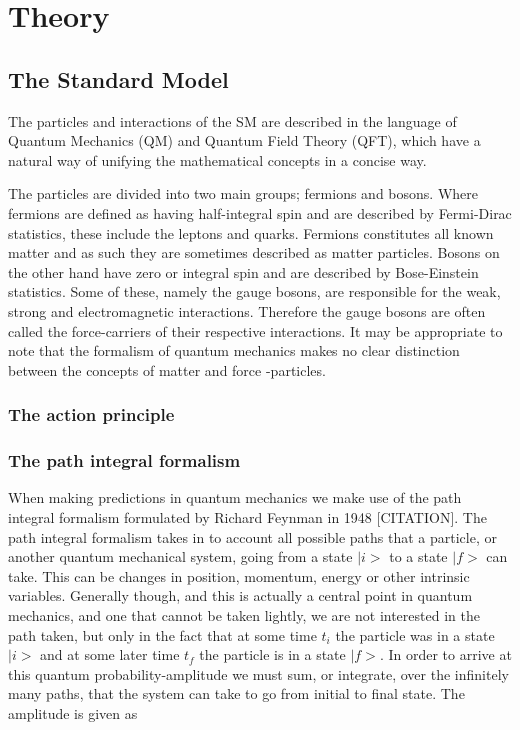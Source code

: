 \section{Theory}
\subsection{The Standard Model}
The particles and interactions of the SM are described in the language of Quantum Mechanics (QM) and Quantum Field Theory (QFT), which have a natural way of unifying the mathematical concepts in a concise way.

The particles are divided into two main groups; fermions and bosons. Where fermions are defined as having half-integral spin and are described by Fermi-Dirac statistics, these include the leptons and quarks. Fermions constitutes all known matter and as such they are sometimes described as matter particles. Bosons on the other hand have zero or integral spin and are described by Bose-Einstein statistics. Some of these, namely the gauge bosons, are responsible for the weak, strong and electromagnetic interactions. Therefore the gauge bosons are often called the force-carriers of their respective interactions. It may be appropriate to note that the formalism of quantum mechanics makes no clear distinction between the concepts of matter and force -particles.


\subsubsection{The action principle}

\subsubsection{The path integral formalism}
When making predictions in quantum mechanics we make use of the path integral formalism formulated by Richard Feynman in 1948 [CITATION]. The path integral formalism takes in to account all possible paths that a particle, or another quantum mechanical system, going from a state $|i>$ to a state $|f>$ can take. This can be changes in position, momentum, energy or other intrinsic variables. Generally though, and this is actually a central point in quantum mechanics, and one that cannot be taken lightly, we are not interested in the path taken, but only in the fact that at some time $t_{i}$ the particle was in a state $|i>$ and at some later time $t_{f}$ the particle is in a state $|f>$. In order to arrive at this quantum probability-amplitude we must sum, or integrate, over  the infinitely many paths, that the system can take to go from initial to final state. The amplitude is given as \cite{richter_path_integrals}


